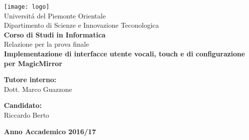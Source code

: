 \begin{titlepage}
\begin{center}
\texttt{[image: logo]}
\\[1\baselineskip]
\Large Universit\'a del Piemonte Orientale
\\[2\baselineskip]
\Large Dipartimento di Scienze e Innovazione Teconologica
\\[1\baselineskip]
\textbf{\Large Corso di Studi in Informatica}
\\[2\baselineskip]
\normalsize Relazione per la prova finale
\\[1\baselineskip]

{\LARGE \bfseries Implementazione di interfacce utente vocali, touch e di configurazione per MagicMirror}\\[1cm]
\vspace{1cm}
\begin{minipage}[t]{0.4\textwidth}
\flushleft
{\bf Tutore interno:}\\
Dott. Marco Guazzone\\
\end{minipage}
\begin{minipage}[t]{0.4\textwidth}
\flushright
{\bf Candidato:}\\
Riccardo Berto\\
\end{minipage}
\vfill
\vspace{1cm}
\textbf{\large Anno Accademico 2016/17}
\vfill
\end{center}
\end{titlepage}
